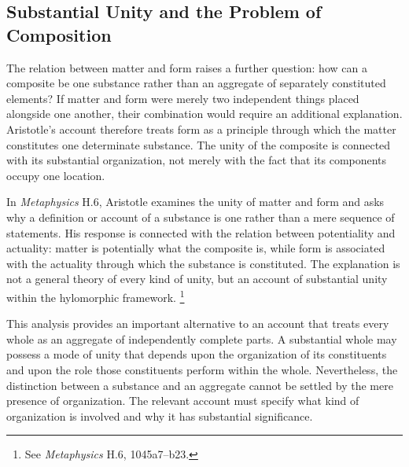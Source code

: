


\subsection{Substantial Unity and the Problem of Composition}

\label{para:VS.B01.P01.C08.S05.SS06.P001}

The relation between matter and form raises a further
question: how can a composite be one substance rather
than an aggregate of separately constituted elements?
If matter and form were merely two independent things
placed alongside one another, their combination would
require an additional explanation. Aristotle's account
therefore treats form as a principle through which
the matter constitutes one determinate substance.
The unity of the composite is connected with its
substantial organization, not merely with the fact
that its components occupy one location.

\label{para:VS.B01.P01.C08.S05.SS06.P002}

In \textit{Metaphysics} H.6, Aristotle examines the
unity of matter and form and asks why a definition
or account of a substance is one rather than a mere
sequence of statements. His response is connected
with the relation between potentiality and actuality:
matter is potentially what the composite is, while
form is associated with the actuality through which
the substance is constituted. The explanation is
not a general theory of every kind of unity, but
an account of substantial unity within the hylomorphic
framework. \footnote{See \textit{Metaphysics} H.6,
1045a7--b23.}

\label{para:VS.B01.P01.C08.S05.SS06.P003}

This analysis provides an important alternative
to an account that treats every whole as an aggregate
of independently complete parts. A substantial
whole may possess a mode of unity that depends
upon the organization of its constituents and upon
the role those constituents perform within the
whole. Nevertheless, the distinction between a
substance and an aggregate cannot be settled by
the mere presence of organization. The relevant
account must specify what kind of organization is
involved and why it has substantial significance.

